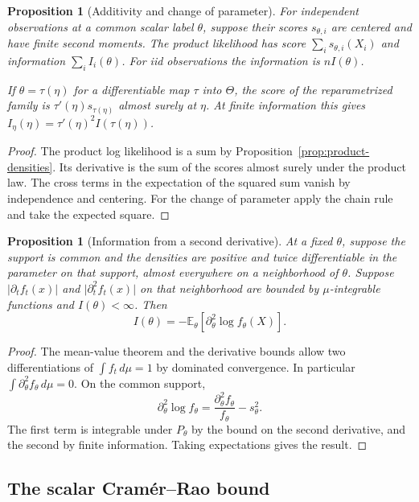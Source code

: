 \documentclass[11pt,oneside]{book}
\newtheorem{proposition}[theorem]{Proposition}
\theoremstyle{definition}
\theoremstyle{remark}
\begin{document}
\begin{proposition}[Additivity and change of parameter]
\label{prop:fisher-product-reparametrization}
For independent observations at a common scalar label $\theta$,
suppose their scores $s_{\theta,i}$ are centered and have finite
second moments. The product likelihood has score
$\sum_i s_{\theta,i}(X_i)$ and information $\sum_i I_i(\theta)$.
For iid observations the information is $nI(\theta)$.

If $\theta=\tau(\eta)$ for a differentiable map $\tau$ into
$\Theta$, the score of the reparametrized family is
$\tau'(\eta)s_{\tau(\eta)}$ almost surely at $\eta$.
At finite information this gives
$I_\eta(\eta)=\tau'(\eta)^2 I(\tau(\eta))$.
\end{proposition}
\begin{proof}
The product log likelihood is a sum by
Proposition~\ref{prop:product-densities}. Its derivative is the
sum of the scores almost surely under the product law. The
cross terms in the expectation of the squared sum vanish by
independence and centering. For the change of parameter apply
the chain rule and take the expected square.
\end{proof}

\begin{proposition}[Information from a second derivative]
\label{prop:fisher-expected-curvature}
At a fixed $\theta$, suppose the support is common and the densities
are positive and twice differentiable in the parameter on that
support, almost everywhere on a neighborhood of $\theta$.
Suppose $\lvert\partial_t f_t(x)\rvert$ and
$\lvert\partial_t^2 f_t(x)\rvert$ on that neighborhood are bounded
by $\mu$-integrable functions and $I(\theta)<\infty$. Then
\[
I(\theta)=-\mathbb E_\theta[\partial_\theta^2\log f_\theta(X)] .
\]
\end{proposition}
\begin{proof}
The mean-value theorem and the derivative bounds allow two
differentiations of $\int f_t\,d\mu=1$ by dominated convergence.
In particular $\int\partial_\theta^2 f_\theta\,d\mu=0$.
On the common support,
\[
\partial_\theta^2\log f_\theta
=\frac{\partial_\theta^2 f_\theta}{f_\theta}-s_\theta^2 .
\]
The first term is integrable under $P_\theta$ by the bound on
the second derivative, and the second by finite information.
Taking expectations gives the result.
\end{proof}

\subsection{The scalar Cram\'er--Rao bound}
\label{subsec:scalar-cramer-rao}
\end{document}
